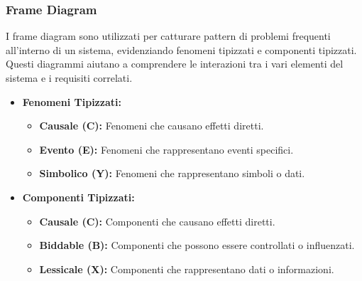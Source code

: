\subsubsection{Frame Diagram}
I frame diagram sono utilizzati per catturare pattern di problemi frequenti all'interno di un sistema, evidenziando fenomeni tipizzati e componenti tipizzati. Questi diagrammi aiutano a comprendere le interazioni tra i vari elementi del sistema e i requisiti correlati.

\begin{itemize}
    \item \textbf{Fenomeni Tipizzati:}
    \begin{itemize}
        \item \textbf{Causale (C):} Fenomeni che causano effetti diretti.
        \item \textbf{Evento (E):} Fenomeni che rappresentano eventi specifici.
        \item \textbf{Simbolico (Y):} Fenomeni che rappresentano simboli o dati.
    \end{itemize}

    \item \textbf{Componenti Tipizzati:}
    \begin{itemize}
        \item \textbf{Causale (C):} Componenti che causano effetti diretti.
        \item \textbf{Biddable (B):} Componenti che possono essere controllati o influenzati.
        \item \textbf{Lessicale (X):} Componenti che rappresentano dati o informazioni.
    \end{itemize}
\end{itemize}

